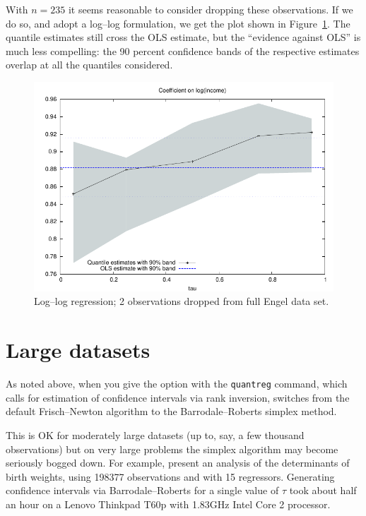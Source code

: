 With $n = 235$ it seems reasonable to consider dropping these
observations.  If we do so, and adopt a log--log formulation, we get
the plot shown in Figure~\ref{fig:tau2}.  The quantile estimates still
cross the OLS estimate, but the ``evidence against OLS'' is much less
compelling: the 90 percent confidence bands of the respective
estimates overlap at all the quantiles considered.

\begin{figure}
  \centering
  \includegraphics{figures/tau-sequence2}
  \caption{Log--log regression; 2 observations dropped from full Engel data
    set.}
  \label{fig:tau2}
\end{figure}


\section{Large datasets}
\label{sec:bigdata}

As noted above, when you give the  option with the
\texttt{quantreg} command, which calls for estimation of confidence
intervals via rank inversion,  switches from the default
Frisch--Newton algorithm to the Barrodale--Roberts simplex method.

This is OK for moderately large datasets (up to, say, a few thousand
observations) but on very large problems the simplex algorithm may
become seriously bogged down.  For example, \cite{koenker-hallock01}
present an analysis of the determinants of birth weights, using 
198377 observations and with 15 regressors.  Generating confidence
intervals via Barrodale--Roberts for a single value of $\tau$ took
about half an hour on a Lenovo Thinkpad T60p with 1.83GHz Intel Core 2
processor.

